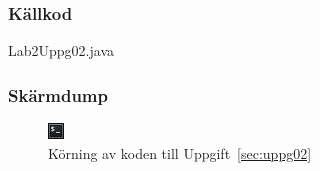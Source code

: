 \subsubsection{Källkod}
\caption{Lab2Uppg02.java}
\label{src:uppg02}


\subsubsection{Skärmdump}
\begin{figure}[htbp]
    \centering
        \includegraphics[width=\linewidth]{img/02.png}
    \caption{Körning av koden till Uppgift~\ref{sec:uppg02}}
\label{fig:uppg02-screenshot}
\end{figure}

